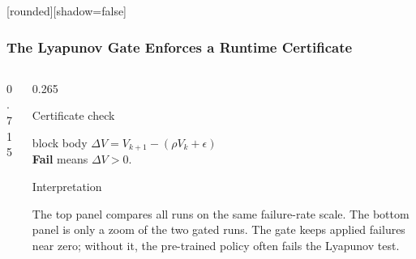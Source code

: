 \documentclass[aspectratio=169]{beamer}
\begin{document}
\begin{frame}
[rounded][shadow=false]
\frametitle{\large \textbf{The Lyapunov Gate Enforces a Runtime Certificate}}
\scriptsize

\vspace{-0.30cm}
\begin{columns}[T,onlytextwidth]

\begin{column}{0.715\textwidth}
\centering
\hspace*{-0.14cm}\resizebox{1.02\linewidth}{!}{\LyapunovCertificateFigure}
\end{column}

\begin{column}{0.265\textwidth}
\fontsize{7.8}{8.8}\selectfont
\begin{block}{Certificate check}
\centering
\renewcommand{\arraystretch}{1.18}
\setlength{\tabcolsep}{3.0pt}
\end{block}

\vspace{0.05cm}
\begin{beamercolorbox}[rounded=true,sep=4pt,wd=\linewidth]{block body}
\centering
\(\Delta V = V_{k+1}-(\rho V_k+\epsilon)\)\\[-0.2ex]
\textbf{Fail} means \(\Delta V>0\).
\end{beamercolorbox}

\vspace{0.05cm}
\begin{block}{Interpretation}
\raggedright
The top panel compares all runs on the same failure-rate scale. The bottom panel is only a zoom of the two gated runs. The gate keeps applied failures near zero; without it, the pre-trained policy often fails the Lyapunov test.
\end{block}
\end{column}

\end{columns}

\end{frame}
\end{document}
